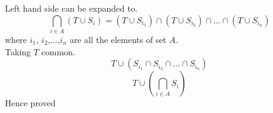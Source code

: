 \documentclass[a4paper]{exam}
\begin{document}
\begin{questions}
\begin{parts}
\begin{solution}
       Left hand side can be expanded to.
       \[\bigcap_{i \in A} (T \cup S_i) = (T \cup S_{i_1} )\cap( T \cup S_{i_2}) \cap \ldots \cap (T \cup S_{i_n})\]
    where $i_1$, $i_2$,...,$i_n$ are all the elements of set $A$.\\
     Taking $T$ common.
        \[T \cup \left( S_{i_1} \cap S_{i_2} \cap \ldots \cap S_{i_n} \right)\]
        \[T \cup \left(\bigcap_{i\in A}S_i  \right)\]
        Hence proved

    
    \end{solution}
  \end{parts}

\end{questions}
\end{document}
